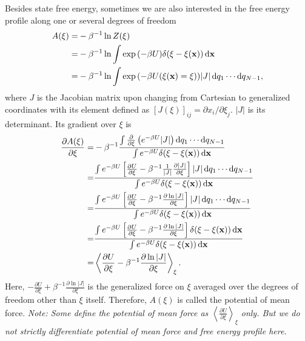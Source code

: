 Besides state free energy, sometimes we are also interested in the free energy profile along one or several degrees of freedom
\begin{align}
	A(\xi)=&-\beta^{-1}\ln{Z(\xi)}\notag\\
	      =&-\beta^{-1}\ln\int \exp{\left(-\beta U\right)}\delta(\xi-\xi(\mathbf{x}))\mathop{}\!\mathrm{d}\mathbf{x}\notag\\
	      =&-\beta^{-1}\ln\int \exp{\left(-\beta U(\xi(\mathbf{x})=\xi)\right)}|J|\mathop{}\!\mathrm{d} q_1\cdots \mathop{}\!\mathrm{d} q_{N-1},
\end{align}
where $J$ is the Jacobian matrix upon changing from Cartesian to generalized coordinates with its element defined as $\left[J(\xi)\right]_{ij}=\partial x_i/\partial \xi_j$. $|J|$ is its determinant. Its gradient over $\xi$ is
\begin{align}
\frac{\partial A(\xi)}{\partial \xi}=&-\beta^{-1}\frac{\int \frac{\partial}{\partial \xi}\left(e^{-\beta U}|J|\right)\diff q_1\cdots \diff q_{N-1}}{\int e^{-\beta U}\delta(\xi-\xi(\mathbf{x}))\diff\mathbf{x}}\notag\\
                                    =&\frac{\int e^{-\beta U}\left[\frac{\partial U}{\partial \xi}-\beta^{-1}\frac{1}{|J|}\frac{\partial |J|}{\partial \xi}\right]|J|\diff q_1\cdots \diff q_{N-1}}{\int e^{-\beta U}\delta(\xi-\xi(\mathbf{x}))\diff \mathbf{x}}\notag\\
                                    =&\frac{\int e^{-\beta U}\left[\frac{\partial U}{\partial \xi}-\beta^{-1}\frac{\partial \ln|J|}{\partial \xi}\right]|J|\diff q_1\cdots \diff q_{N-1}}{\int e^{-\beta U}\delta(\xi-\xi(\mathbf{x}))\diff \mathbf{x}}\notag\\
                                    =&\frac{\int e^{-\beta U}\left[\frac{\partial U}{\partial \xi}-\beta^{-1}\frac{\partial \ln|J|}{\partial \xi}\right]\delta(\xi-\xi(\mathbf{x}))\diff\mathbf{x}}{\int e^{-\beta U}\delta(\xi-\xi(\mathbf{x}))\diff \mathbf{x}}\notag\\
                                    =&\left<\frac{\partial U}{\partial \xi}-\beta^{-1}\frac{\partial \ln |J|}{\partial \xi}\right>_\xi.
\end{align}
Here, $-\frac{\partial U}{\partial \xi}+\beta^{-1}\frac{\partial \ln |J|}{\partial \xi}$ is the generalized force on $\xi$ averaged over the degrees of freedom other than $\xi$ itself. Therefore, $A(\xi)$ is called the potential of mean force. \textit{Note: Some define the potential of mean force as $\left<\frac{\partial U}{\partial \xi}\right>_\xi$ only. But we do not strictly differentiate potential of mean force and free energy profile here.}

